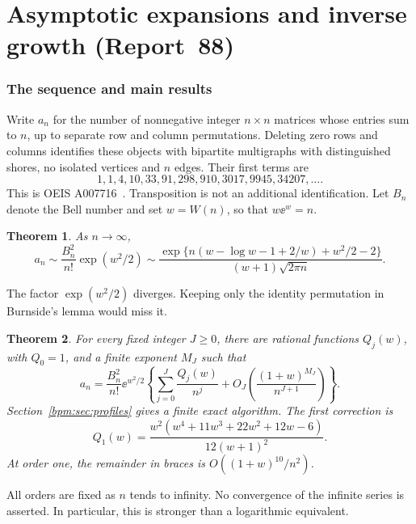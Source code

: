 \documentclass[11pt,a4paper]{article}
\newtheorem{theorem}{Theorem}[section]\newtheorem{lemma}[theorem]{Lemma}\newtheorem{proposition}[theorem]{Proposition}
\theoremstyle{remark}\newtheorem{remark}[theorem]{Remark}%
\begin{document}
\part{Asymptotic expansions and inverse growth (Report~88)}\label{bpm:part:one}

\section{The sequence and main results}
Write $a_n$ for the number of nonnegative integer $n\times n$ matrices whose entries sum to $n$, up to separate row and column permutations. Deleting zero rows and columns identifies these objects with bipartite multigraphs with distinguished shores, no isolated vertices and $n$ edges. Their first terms are
\[
1,1,4,10,33,91,298,910,3017,9945,34207,\ldots .
\]
This is OEIS A007716~\cite{OEIS}. Transposition is not an additional identification.
Let $B_n$ denote the Bell number and set $w=W(n)$, so that $w\ee^w=n$.

\begin{theorem}\label{bpm:thm:leading}
As $n\to\infty$,
\begin{equation}\label{bpm:eq:leading}
 a_n\sim\frac{B_n^2}{n!}\exp(w^2/2)
 \sim\frac{\exp\{n(w-\log w-1+2/w)+w^2/2-2\}}
 {(w+1)\sqrt{2\pi n}}.
\end{equation}
\end{theorem}
The factor $\exp(w^2/2)$ diverges. Keeping only the identity permutation in Burnside's lemma would miss it.

\begin{theorem}\label{bpm:thm:all}
For every fixed integer $J\ge0$, there are rational functions $Q_j(w)$, with $Q_0=1$, and a finite exponent $M_J$ such that
\begin{equation}\label{bpm:eq:all}
 a_n=\frac{B_n^2}{n!}\ee^{w^2/2}
 \left\{\sum_{j=0}^J\frac{Q_j(w)}{n^j}
       +O_J\!\left(\frac{(1+w)^{M_J}}{n^{J+1}}\right)\right\}.
\end{equation}
Section~\ref{bpm:sec:profiles} gives a finite exact algorithm. The first correction is
\begin{equation}\label{bpm:eq:Q1}
 Q_1(w)=\frac{w^2(w^4+11w^3+22w^2+12w-6)}{12(w+1)^2}.
\end{equation}
At order one, the remainder in braces is $O((1+w)^{10}/n^2)$.
\end{theorem}
All orders are fixed as $n$ tends to infinity. No convergence of the infinite series is asserted. In particular, this is stronger than a logarithmic equivalent.
\end{document}
